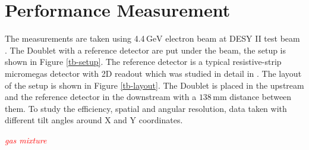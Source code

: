 \documentclass[a4paper,11pt]{article}
\newcommand{\myunit}[1]{$\, \mathrm{#1}$}
\begin{document}
\section{Performance Measurement}
\label{Sec:Performance}
The measurements are taken using 4.4\myunit{GeV} electron beam at DESY II test beam \cite{web-tb}. The Doublet with a reference detector are put under the beam, the setup is shown in Figure \ref{tb-setup}. The reference detector is a typical resistive-strip micromegas detector with 2D readout which was studied in detail in \cite{Lin2014281}. The layout of the setup is shown in Figure \ref{tb-layout}. The Doublet is placed in the upstream and the reference detector in the downstream with a $138$\myunit{mm} distance between them. To study the efficiency, spatial and angular resolution, data taken with different tilt angles around X and Y coordinates. 

\textcolor{red}{\emph{gas mixture}}
\end{document}
